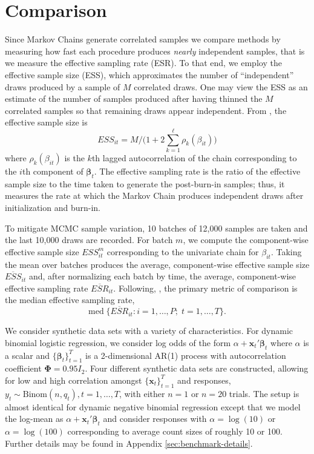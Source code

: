 \documentclass[12pt]{article}
\newcommand{\bbeta}{\boldsymbol{\beta}}
\newcommand{\vx}{\boldsymbol{x}}
\newcommand{\bPhi}{\boldsymbol{\Phi}}
\begin{document}
\section{Comparison}


Since Markov Chains generate correlated samples we compare methods by measuring
how fast each procedure produces \emph{nearly} independent samples, that is we
measure the effective sampling rate (ESR).  To that end, we employ the effective
sample size (ESS), which approximates the number of ``independent'' draws
produced by a sample of $M$ correlated draws.  One may view the ESS as an
estimate of the number of samples produced after having thinned the $M$
correlated samples so that remaining draws appear independent.  From
\cite{holmes-held-2006}, the effective sample size is
\[
ESS_{it} = M / \Big( 1 + 2 \sum_{k=1}^\ell \rho_k(\beta_{it}) \Big)
\]
where $\rho_k(\beta_{it})$ is the $k$th lagged autocorrelation of the chain
corresponding to the $i$th component of $\bbeta_t$.  The effective
sampling rate is the ratio of the effective sample size to the time taken to
generate the post-burn-in samples; thus, it measures the rate at which the
Markov Chain produces independent draws after initialization and burn-in.

To mitigate MCMC sample variation, 10 batches of 12,000 samples are taken and
the last 10,000 draws are recorded.  For batch $m$, we compute the
component-wise effective sample size $ESS_{it}^{m}$ corresponding to the
univariate chain for $\beta_{it}$.  Taking the mean over batches produces the
average, component-wise effective sample size $\overline{ESS}_{it}$ and, after
normalizing each batch by time, the average, component-wise effective sampling
rate $\overline{ESR}_{it}$.  Following,
\cite{fruhwirth-schnatter-fruhwirth-2010}, the primary metric of comparison is
the median effective sampling rate,
\[
\text{med} \; \Big\{ \overline{ESR}_{it} : i=1, \ldots, P; \;  t=1, \ldots, T \Big\}.
\]

We consider synthetic data sets with a variety of characteristics.
For dynamic binomial logistic regression, we consider log odds of the form
$\alpha + \vx_t' \bbeta_t$ where $\alpha$ is a scalar and $\{\bbeta_t\}_{t=1}^T$ is
a 2-dimensional AR(1) process with autocorrelation coefficient $\bPhi = 0.95
I_2$.  Four different synthetic data sets are constructed, allowing for low and
high correlation amongst $\{\vx_t\}_{t=1}^T$ and responses, $y_t \sim
\text{Binom}(n, q_t), t=1, \ldots, T$, with either $n=1$ or $n=20$ trials.  The
setup is almost identical for dynamic negative binomial regression except that
we model the log-mean as $\alpha + \vx_t' \bbeta_t$ and consider responses with
$\alpha = \log(10)$ or $\alpha = \log(100)$ corresponding to average count sizes
of roughly 10 or 100.  Further details may be found in Appendix
\ref{sec:benchmark-details}.
\end{document}
